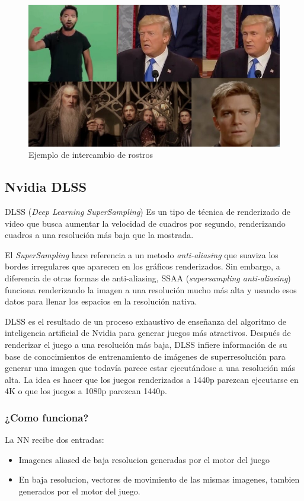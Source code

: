 \documentclass[runningheads]{llncs} %
\begin{document}
\begin{figure}
    \centering
    \includegraphics[scale=0.35]{ej4-deepfake.jpg}
    \caption{Ejemplo de intercambio de rostros \cite{ej-deepfake1}}
    \label{fig:deepfake-ej4}
\end{figure}

\newpage
\subsection{Nvidia DLSS}
DLSS (\textit{Deep Learning SuperSampling}) Es un tipo de técnica de 
renderizado de video que busca aumentar la velocidad de cuadros por
segundo, renderizando cuadros a una resolución más baja que la mostrada.

El \textit{SuperSampling} hace
referencia a un metodo \textit{anti-aliasing} que suaviza los bordes 
irregulares que aparecen en los gráficos renderizados. 
Sin embargo, a diferencia de otras formas de anti-aliasing, 
SSAA (\textit{supersampling anti-aliasing}) funciona renderizando la imagen 
a una resolución mucho más alta y usando esos datos para llenar 
los espacios en la resolución nativa. \cite{ej-dlss}

DLSS es el resultado de un proceso exhaustivo de enseñanza del algoritmo
de inteligencia artificial de Nvidia para generar juegos más atractivos.
Después de renderizar el juego a una resolución más baja, 
DLSS infiere información de su base de conocimientos de entrenamiento 
de imágenes de superresolución para generar una imagen que todavía 
parece estar ejecutándose a una resolución más alta. 
La idea es hacer que los juegos renderizados a 1440p parezcan 
ejecutarse en 4K o que los juegos a 1080p parezcan 1440p. \cite{ej-dlss}

\subsubsection{¿Como funciona?}
La NN recibe dos entradas: 
\begin{itemize}
    \item{Imagenes aliased de baja resolucion generadas por el motor del
    juego}
    \item{En baja resolucion, vectores de movimiento de las mismas imagenes,
    tambien generados por el motor del juego.}
\end{itemize}
\end{document}
